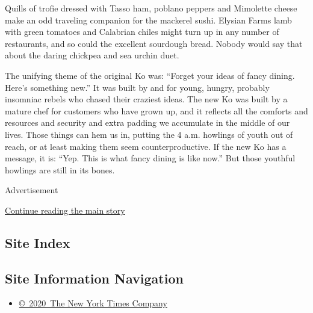 Quills of trofie dressed with Tasso ham, poblano peppers and Mimolette
cheese make an odd traveling companion for the mackerel sushi. Elysian
Farms lamb with green tomatoes and Calabrian chiles might turn up in any
number of restaurants, and so could the excellent sourdough bread.
Nobody would say that about the daring chickpea and sea urchin duet.

The unifying theme of the original Ko was: ``Forget your ideas of fancy
dining. Here's something new.'' It was built by and for young, hungry,
probably insomniac rebels who chased their craziest ideas. The new Ko
was built by a mature chef for customers who have grown up, and it
reflects all the comforts and resources and security and extra padding
we accumulate in the middle of our lives. Those things can hem us in,
putting the 4 a.m. howlings of youth out of reach, or at least making
them seem counterproductive. If the new Ko has a message, it is: ``Yep.
This is what fancy dining is like now.'' But those youthful howlings are
still in its bones.

Advertisement

\protect\hyperlink{after-bottom}{Continue reading the main story}

\hypertarget{site-index}{%
\subsection{Site Index}\label{site-index}}

\hypertarget{site-information-navigation}{%
\subsection{Site Information
Navigation}\label{site-information-navigation}}

\begin{itemize}
\tightlist
\item
  \href{https://help.nytimes3xbfgragh.onion/hc/en-us/articles/115014792127-Copyright-notice}{©~2020~The
  New York Times Company}
\end{itemize}


